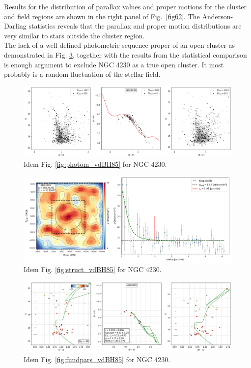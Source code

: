 \documentclass[draft]{aa}
\begin{document}
Results for the distribution of parallax values and proper motions for the
cluster and field regions are shown in the right panel of Fig.~\ref{fig62}.
The Anderson-Darling statistics reveals that the parallax and
proper motion distributions are very similar to stars outside the
cluster region.\\

The lack of a well-defined photometric sequence proper of an open cluster as
demonstrated in Fig. \ref{fig61}, together with the results from
the statistical comparison is enough argument to exclude NGC 4230 as a true open
cluster. It most probably is a random fluctuation of the stellar field.

\begin{figure}[ht]
    \centering
    \includegraphics[width=\hsize]{../figs/obs_NGC4230.png}
    \caption{Idem Fig. \ref{fig:photom_vdBH85} for NGC 4230.}
    \label{fig59}
\end{figure}
\begin{figure}[ht]
    \centering
    \includegraphics[width=\hsize]{../figs/dmap_ngc4230.png}
    \caption{Idem Fig. \ref{fig:struct_vdBH85} for NGC 4230.}
    \label{fig60}
\end{figure}
\begin{figure}[ht]
    \centering
    \includegraphics[width=\hsize]{../figs/cmds_ngc4230.png}
    \caption{Idem Fig. \ref{fig:fundpars_vdBH85} for NGC 4230.}
    \label{fig61}
\end{figure}
\end{document}
